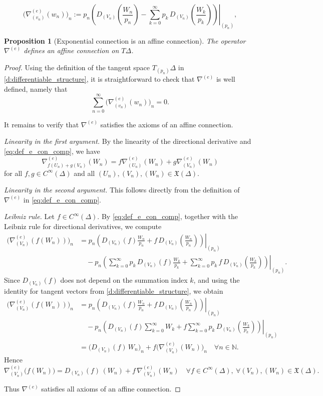 \documentclass[10pt,a4paper]{amsart}
\newtheorem{proposition}{Proposition}
\def\NN{\mathbb{N}}
\newcommand\restr[2]{\ensuremath{\left.#1\right|_{#2}}}
\begin{document}
\begin{equation}\label{eq:def_e_con_comp}
\bigl(\nabla^{(e)}_{(v_n)}(w_n)\bigr)_n
:=
p_n
\restr{\left(
D_{(V_n)}\!\left(\frac{W_n}{p_n}\right)
-
\sum_{k=0}^{\infty}
p_k\,D_{(V_n)}\!\left(\frac{W_k}{p_k}\right)
\right)}{(p_n)},
\end{equation}

\begin{proposition}[Exponential connection is an affine connection]
The operator \(\nabla^{(e)}\) defines an affine connection on \(T\Delta\).
\end{proposition}

\begin{proof}
Using the definition of the tangent space \(T_{(p_n)}\Delta\) in \eqref{d:differentiable_structure}, it is straightforward to check that \(\nabla^{(e)}\) is well defined, namely that
\[
\sum_{n=0}^{\infty}\bigl(\nabla^{(e)}_{(v_n)}(w_n)\bigr)_n = 0.
\]

It remains to verify that \(\nabla^{(e)}\) satisfies the axioms of an affine connection.

\textit{Linearity in the first argument.}
By the linearity of the directional derivative and \eqref{eq:def_e_con_comp}, we have
\[
\nabla^{(e)}_{f(U_n)+g(V_n)}(W_n)
=
f\nabla^{(e)}_{(U_n)}(W_n)
+
g\nabla^{(e)}_{(V_n)}(W_n)
\]
for all \(f,g\in C^{\infty}(\Delta)\) and all \((U_n),(V_n),(W_n)\in \mathfrak{X}(\Delta)\).

\textit{Linearity in the second argument.}
This follows directly from the definition of \(\nabla^{(e)}\) in \eqref{eq:def_e_con_comp}.

\textit{Leibniz rule.}
Let \(f\in C^\infty(\Delta)\). By \eqref{eq:def_e_con_comp}, together with the Leibniz rule for directional derivatives, we compute
\begin{align*}
\bigl(\nabla^{(e)}_{(V_n)}(f(W_n))\bigr)_n
&=
p_n\restr{\left(
D_{(V_n)}(f)\frac{W_n}{p_n}
+
f\,D_{(V_n)}\!\left(\frac{W_n}{p_n}\right)\right)}{(p_n)}\\
&\quad
- p_n \restr{\left(
\sum_{k=0}^{\infty}p_k\,D_{(V_n)}(f)\frac{W_k}{p_k}
+
\sum_{k=0}^{\infty}p_k\,f\,D_{(V_n)}\!\left(\frac{W_k}{p_k}\right)
\right)}{(p_n)}.
\end{align*}
Since \(D_{(V_n)}(f)\) does not depend on the summation index \(k\), and using the identity for tangent vectors from \eqref{d:differentiable_structure}, we obtain
\begin{align*}
\bigl(\nabla^{(e)}_{(V_n)}(f(W_n))\bigr)_n
&=
p_n\restr{\left(
D_{(V_n)}(f)\frac{W_n}{p_n}
+
f\,D_{(V_n)}\!\left(\frac{W_n}{p_n}\right)\right)}{(p_n)}\\
&\quad
- p_n\restr{\left(
D_{(V_n)}(f)\sum_{k=0}^{\infty}W_k
+
f\sum_{k=0}^{\infty}p_k\,D_{(V_n)}\!\left(\frac{W_k}{p_k}\right)
\right)}{(p_n)} \\
&=
\bigl(D_{(V_n)}(f)\,W_n\bigr)_n
+
f\bigl(\nabla^{(e)}_{(V_n)}(W_n)\bigr)_n \quad \forall n\in \NN.
\end{align*}
Hence
\[
\nabla^{(e)}_{(V_n)}\bigl(f(W_n)\bigr)
=
D_{(V_n)}(f)\,(W_n)
+
f\,\nabla^{(e)}_{(V_n)}(W_n)
\quad \forall f\in C^{\infty}(\Delta),\ \forall (V_n),(W_n)\in \mathfrak{X}(\Delta).
\]

Thus \(\nabla^{(e)}\) satisfies all axioms of an affine connection.
\end{proof}
\end{document}
